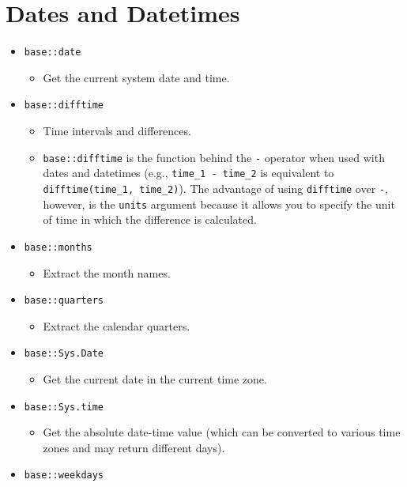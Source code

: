 \documentclass[
]{book}
\providecommand{\tightlist}{%
  \setlength{\itemsep}{0pt}\setlength{\parskip}{0pt}}
\begin{document}
\hypertarget{dates-and-datetimes-1}{%
\section{Dates and Datetimes}\label{dates-and-datetimes-1}}

\begin{itemize}
\tightlist
\item
  \texttt{base::date}

  \begin{itemize}
  \tightlist
  \item
    Get the current system date and time.
  \end{itemize}
\item
  \texttt{base::difftime}

  \begin{itemize}
  \tightlist
  \item
    Time intervals and differences.
  \item
    \texttt{base::difftime} is the function behind the \texttt{-} operator when used with dates and datetimes (e.g., \texttt{time\_1\ -\ time\_2} is equivalent to \texttt{difftime(time\_1,\ time\_2)}). The advantage of using \texttt{difftime} over \texttt{-}, however, is the \texttt{units} argument because it allows you to specify the unit of time in which the difference is calculated.
  \end{itemize}
\item
  \texttt{base::months}

  \begin{itemize}
  \tightlist
  \item
    Extract the month names.
  \end{itemize}
\item
  \texttt{base::quarters}

  \begin{itemize}
  \tightlist
  \item
    Extract the calendar quarters.
  \end{itemize}
\item
  \texttt{base::Sys.Date}

  \begin{itemize}
  \tightlist
  \item
    Get the current date in the current time zone.
  \end{itemize}
\item
  \texttt{base::Sys.time}

  \begin{itemize}
  \tightlist
  \item
    Get the absolute date-time value (which can be converted to various time zones and may return different days).
  \end{itemize}
\item
  \texttt{base::weekdays}


\end{itemize}
\end{document}
